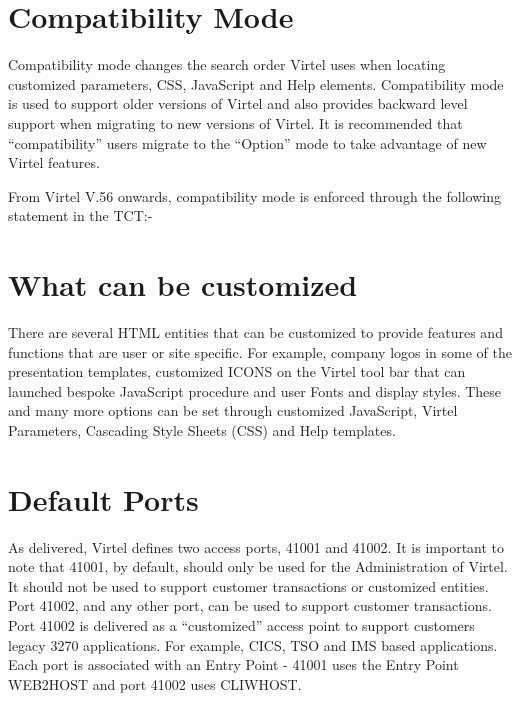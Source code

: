 \documentclass[letterpaper,10pt,english]{sphinxmanual}
\begin{document}
\section{Compatibility Mode}
\label{\detokenize{TN202002:compatibility-mode}}
Compatibility mode changes the search order Virtel uses when locating customized parameters, CSS, JavaScript and Help elements. Compatibility mode is used to support older versions of Virtel and also provides backward level support when migrating to new versions of Virtel. It is recommended that “compatibility” users migrate to the “Option” mode to take advantage of new Virtel features.

From Virtel V.56 onwards, compatibility mode is enforced through the following statement in the TCT:-

\begin{sphinxVerbatim}[commandchars=\\\{\}]
                  
\end{sphinxVerbatim}


\section{What can be customized}
\label{\detokenize{TN202002:what-can-be-customized}}
There are several HTML entities that can be customized to provide features and functions that are user or site specific. For example, company logos in some of the presentation templates, customized ICONS on the Virtel tool bar that can launched bespoke JavaScript procedure and user Fonts and display styles. These and many more options can be set through customized JavaScript, Virtel Parameters, Cascading Style Sheets (CSS) and Help templates.


\section{Default Ports}
\label{\detokenize{TN202002:default-ports}}
As delivered, Virtel defines two access ports, 41001 and 41002. It is important to note that 41001, by default, should only be used for the Administration of Virtel. It should not be used to support customer transactions or customized entities. Port 41002, and any other port, can be used to support customer transactions. Port 41002 is delivered as a “customized” access point to support customers legacy 3270 applications. For example, CICS, TSO and IMS based applications. Each port is associated with an Entry Point - 41001 uses the Entry Point WEB2HOST and port 41002 uses CLIWHOST.
\end{document}
